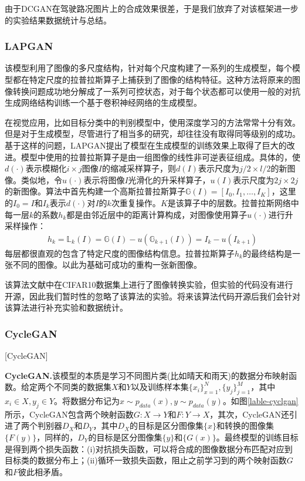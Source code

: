 由于DCGAN在驾驶路况图片上的合成效果很差，于是我们放弃了对该框架进一步的实验结果数据统计与总结。

\subsubsection{LAPGAN}

 该模型利用了图像的多尺度结构，针对每个尺度构建了一系列的生成模型，每个模型都在特定尺度的拉普拉斯算子\cite{lapcode}上捕获到了图像的结构特征。这种方法将原来的图像转换问题成功地分解成了一系列可控状态，对于每个状态都可以使用一般的对抗生成网络结构训练一个基于卷积神经网络的生成模型。

在视觉应用，比如目标分类中的判别模型中，使用深度学习的方法常常十分有效。但是对于生成模型，尽管进行了相当多的研究\cite{lapgan1}\cite{lapgan2}\cite{lapgan3}，却往往没有取得同等级别的成功。基于这样的问题，LAPGAN提出了模型在生成模型的训练效果上取得了巨大的改进。模型中使用的拉普拉斯算子是由一组图像的线性非可逆表征组成。具体的，使$d(\cdot)$表示模糊化$i\times j$图像$I$的缩减采样算子，则$d(I)$表示尺度为$j/2\times l/2$的新图像。类似地，令$u(\cdot)$表示将图像$I$光滑化的升采样算子，$u(I)$表示尺度为$2j\times 2j$的新图像。算法中首先构建一个高斯拉普拉斯算子$\mathbb{G}(I)=[I_0,I_1,\dots,I_K]$，这里的$I_0=I$和$I_k$表示$d(\cdot)$对$I$的$k$次重复操作。$K$是该算子中的层数。拉普拉斯网络中每一层$k$的系数$h_k$都是由邻近层中的距离计算构成，对图像使用算子$u(\cdot)$进行升采样操作：
\begin{gather}
    h_k=\mathbb{L}_k(I)=\mathbb{G}(I)-u(\mathbb{G}_{k+1}(I))=I_k-u(I_{k+1})
\end{gather}
每层都很直观的包含了特定尺度的图像结构信息。拉普拉斯算子$h_k$的最终结构是一张不同的图像。以此为基础可成功的重构一张新图像。

该算法文献\cite{LAPGAN}中在CIFAR10数据集上进行了图像转换实验，但实验的代码没有进行开源，因此我们暂时性的忽略了该算法的实验。将来该算法代码开源后我们会针对该算法进行补充实验和数据统计。 


\subsubsection{CycleGAN}[CycleGAN]

\textbf{CycleGAN.}\cite{CycleGAN}\quad 该模型的本质是学习不同图片类(比如晴天和雨天)的数据分布映射函数。给定两个不同类的数据集$X$和$Y$以及训练样本集$\{x_i\}_{x=1}^N, \{y_j\}_{j=1}^M$，其中$x_i\in X, y_j\in Y$。将数据分布记为$x\sim p_{data}(x), y\sim p_{data}(y)$。如图\ref{lable-cyclgan}所示，CycleGAN包含两个映射函数$G: X\to Y$和$F: Y\to X$，其次，CycleGAN还引进了两个判别器$D_X$和$D_Y$，其中$D_X$的目标是区分图像集$\{x\}$和转换的图像集$\{F(y)\}$，同样的，$D_Y$的目标是区分图像集$\{y\}$和$\{G(x)\}$。最终模型的训练目标是得到两个损失函数：(i)对抗损失函数，可以将合成的图像数据分布匹配对应到目标类的数据分布上；(ii)循环一致损失函数，阻止之前学习到的两个映射函数$G$和$F$彼此相矛盾。


